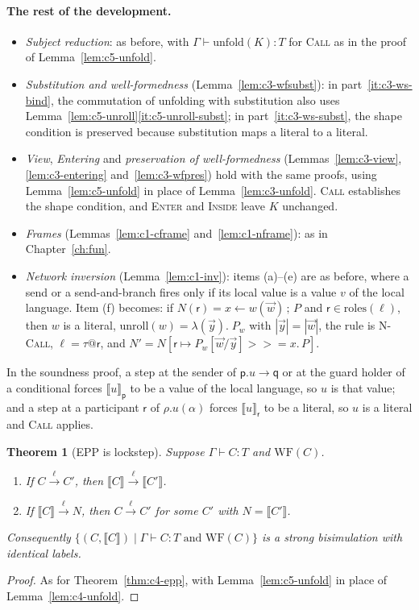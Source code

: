 \documentclass[11pt]{report}
\makeatletter
\theoremstyle{plain}
\newtheorem{theorem}{Theorem}[chapter]
\theoremstyle{definition}
\theoremstyle{remark}
\newcommand{\pp}{\mathsf{p}}
\newcommand{\qq}{\mathsf{q}}
\newcommand{\rr}{\mathsf{r}}
\newcommand{\com}[3]{#1.#2 \to #3}
\newcommand{\mbind}[3]{#1 \mathbin{>\!\!>\!\!=} #2.\,#3}
\newcommand{\unfold}[1]{\mathrm{unfold}(#1)}
\newcommand{\roles}[1]{\mathrm{roles}(#1)}
\newcommand{\WF}{\mathrm{WF}}
\newcommand{\tauat}[1]{\tau\mathord{@}#1}
\newcommand{\lto}[1]{\xrightarrow{\;#1\;}}
\newcommand{\upd}[3]{#1[#2 \mapsto #3]}
\newcommand{\proj}[2]{\llbracket #1 \rrbracket_{#2}}
\newcommand{\projn}[1]{\llbracket #1 \rrbracket}
\newcommand{\nlam}[2]{\lambda(#1).\;#2}
\newcommand{\unroll}[1]{\mathrm{unroll}(#1)}
\newcommand{\rn}[1]{{\normalfont\scshape #1}}
\makeatother
\begin{document}
\paragraph{The rest of the development.}
\begin{itemize}
\item \emph{Subject reduction}: as before, with $\Gamma\vdash\unfold{K}:T$
  for \rn{Call} as in the proof of Lemma~\ref{lem:c5-unfold}.
\item \emph{Substitution and well-formedness}
  (Lemma~\ref{lem:c3-wfsubst}): in part~\ref{it:c3-ws-bind}, the
  commutation of unfolding with substitution also uses
  Lemma~\ref{lem:c5-unroll}\ref{it:c5-unroll-subst}; in
  part~\ref{it:c3-ws-subst}, the shape condition is preserved because
  substitution maps a literal to a literal.
\item \emph{View}, \emph{Entering} and \emph{preservation of
  well-formedness} (Lemmas~\ref{lem:c3-view}, \ref{lem:c3-entering}
  and~\ref{lem:c3-wfpres}) hold with the same proofs, using
  Lemma~\ref{lem:c5-unfold} in place of Lemma~\ref{lem:c3-unfold}.
  \rn{Call} establishes the shape condition, and \rn{Enter} and \rn{Inside}
  leave $K$ unchanged.
\item \emph{Frames} (Lemmas~\ref{lem:c1-cframe} and~\ref{lem:c1-nframe}):
  as in Chapter~\ref{ch:fun}.
\item \emph{Network inversion} (Lemma~\ref{lem:c1-inv}): items (a)--(e) are
  as before, where a send or a send-and-branch fires only if its local value
  is a value $v$ of the local language.  Item (f) becomes: if
  $N(\rr)=x\leftarrow w(\vec w)\,;\,P$ and $\rr\in\roles{\ell}$, then $w$ is
  a literal, $\unroll{w}=\nlam{\vec y}{P_w}$ with $|\vec y|=|\vec w|$, the
  rule is \rn{N-Call}, $\ell=\tauat{\rr}$, and
  $N'=\upd{N}{\rr}{\mbind{P_w[\vec w/\vec y]}{x}{P}}$.
\end{itemize}
In the soundness proof, a step at the sender of $\com{\pp}{u}{\qq}$ or at
the guard holder of a conditional forces $\proj{u}{\pp}$ to be a value of
the local language, so $u$ is that value; and a step at a participant $\rr$
of $\rho.u(\alpha)$ forces $\proj{u}{\rr}$ to be a literal, so $u$ is a
literal and \rn{Call} applies.

\begin{theorem}[EPP is lockstep]\label{thm:c5-epp}
  Suppose $\Gamma\vdash C:T$ and $\WF(C)$.
  \begin{enumerate}[label=(\arabic*),nosep]
  \item If $C\lto{\ell}C'$, then $\projn{C}\lto{\ell}\projn{C'}$.
  \item If $\projn{C}\lto{\ell}N$, then $C\lto{\ell}C'$ for some $C'$ with $N=\projn{C'}$.
  \end{enumerate}
  Consequently $\{(C,\projn{C})\mid\Gamma\vdash C:T\text{ and }\WF(C)\}$ is a
  strong bisimulation with identical labels.
\end{theorem}
\begin{proof}
  As for Theorem~\ref{thm:c4-epp}, with Lemma~\ref{lem:c5-unfold} in place
  of Lemma~\ref{lem:c4-unfold}.
\end{proof}
\end{document}

